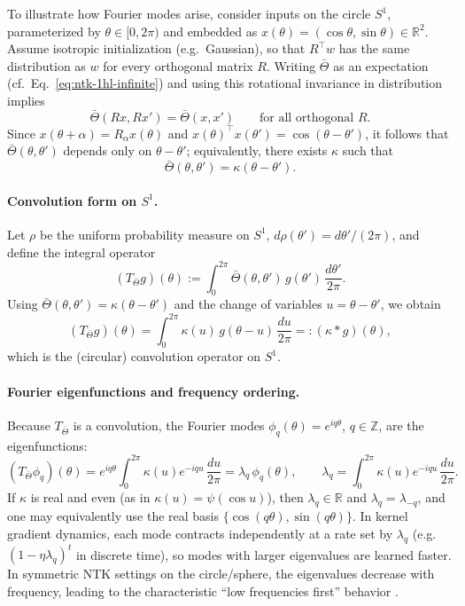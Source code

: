 To illustrate how Fourier modes arise, consider inputs on the circle $S^1$,
parameterized by $\theta\in[0,2\pi)$ and embedded as
$x(\theta)=(\cos\theta,\sin\theta)\in\mathbb R^2$. Assume isotropic
initialization (e.g.\ Gaussian), so that $R^\top w$ has the same distribution as $w$ for every
orthogonal matrix $R$. Writing $\bar\Theta$ as an expectation (cf.\
Eq.~\eqref{eq:ntk-1hl-infinite}) and using this rotational invariance in
distribution implies
\[
	\bar\Theta(Rx,Rx')=\bar\Theta(x,x') \qquad \text{for all orthogonal }R.
\]
Since $x(\theta+\alpha)=R_\alpha x(\theta)$ and
$x(\theta)^\top x(\theta')=\cos(\theta-\theta')$, it follows that
$\bar\Theta(\theta,\theta')$ depends only on $\theta-\theta'$; equivalently,
there exists $\kappa$ such that
\[
	\bar\Theta(\theta,\theta')=\kappa(\theta-\theta').
\]

\paragraph{Convolution form on $S^1$.}
Let $\rho$ be the uniform probability measure on $S^1$,
$d\rho(\theta')=d\theta'/(2\pi)$, and define the integral operator
\[
	(T_{\bar\Theta} g)(\theta)
	:=
	\int_0^{2\pi} \bar\Theta(\theta,\theta')\,g(\theta')\,\frac{d\theta'}{2\pi}.
\]
Using $\bar\Theta(\theta,\theta')=\kappa(\theta-\theta')$ and the change of
variables $u=\theta-\theta'$, we obtain
\[
	(T_{\bar\Theta} g)(\theta)
	=
	\int_0^{2\pi} \kappa(u)\,g(\theta-u)\,\frac{du}{2\pi}
	=: (\kappa * g)(\theta),
\]
which is the (circular) convolution operator on $S^1$.

\paragraph{Fourier eigenfunctions and frequency ordering.}
Because $T_{\bar\Theta}$ is a convolution, the Fourier modes
$\phi_q(\theta)=e^{iq\theta}$, $q\in\mathbb Z$, are the eigenfunctions:
\[
	(T_{\bar\Theta}\phi_q)(\theta)
	=
	e^{iq\theta}\int_0^{2\pi}\kappa(u)e^{-iqu}\,\frac{du}{2\pi}
	=
	\lambda_q\,\phi_q(\theta),
	\qquad
	\lambda_q
	=
	\int_0^{2\pi}\kappa(u)e^{-iqu}\,\frac{du}{2\pi}.
\]
If $\kappa$ is real and even (as in $\kappa(u)=\psi(\cos u)$), then
$\lambda_q\in\mathbb R$ and $\lambda_q=\lambda_{-q}$, and one may equivalently
use the real basis $\{\cos(q\theta),\sin(q\theta)\}$.
In kernel gradient dynamics, each mode contracts independently at a rate set by
$\lambda_q$ (e.g.\ $(1-\eta\lambda_q)^t$ in discrete time), so modes with larger
eigenvalues are learned faster. In symmetric NTK settings on the
circle/sphere, the eigenvalues decrease with frequency, leading to the
characteristic ``low frequencies first'' behavior
\citep{basri2020frequencybiasneuralnetworks,rahaman2019spectralbiasneuralnetworks}.

